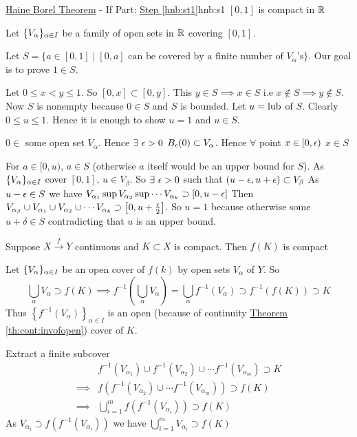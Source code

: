 \begin{Theorem}{\hyperref[th:hnb]{Haine Borel Theorem} - If Part: \hyperref[hnb:st1]{Step \ref{hnb:st1}}}{hnb:s1}
	$[0,1]$ is compact in $\mathbb{R}$
\end{Theorem}
\begin{myproof}
	Let $\{V_{\alpha}\}_{\alpha\in I}$ be a family of open sets in $\mathbb{R}$ covering $[0,1]$.

	Let $S=\{a\in [0,1]\mid [0,a]\text{ can be covered by a finite number of }V_{\alpha}\text{'s}\}$. Our goal is to prove $1\in S$.

	Let $0\leq x<y\leq 1$. So $[0,x]\subset [0,y]$. This $y\in S\implies x\in S$ i.e $x\notin S\implies y\notin S$. Now $S$ is nonempty because $0\in S$ and $S$ is bounded. Let $u=\text{lub}$ of $S$. Clearly $0\leq u\leq 1$. Hence it is enough to show $u=1$ and $u\in S$.

	$0\in$ some open set $V_{\alpha}$. Hence $\exists\ \epsilon>0$ $B_{\epsilon}(0)\subset V_{\alpha}$. Hence $\forall$ point $x\in [0,\epsilon)$ $x\in S$

	For $a\in[0,u)$, $a\in S$ (otherwise $a$ itself would be an upper bound for $S$). As $\{V_{\alpha}\}_{\alpha\in I}$ cover $[0,1]$, $u\in V_{\beta}$. So $\exists \ \epsilon>0$ such that $(u-\epsilon,u+\epsilon)\subset V_{\beta}$ As $u-\epsilon\in S$ we have $V_{\alpha_{1}}\sup V_{\alpha_{2}}\sup\cdots V_{\alpha_{k}}\supset [0,u-\epsilon]$ Then $V_{\alpha_{\beta}}\cup V_{\alpha_{1}}\cup V_{\alpha_{2}}\cup \cdots V_{\alpha_{k}}\supset \left[0,u+\frac{\epsilon}{2}\right]$. So $u=1$ because otherwise some $u+\delta\in S$ contradicting that $u$ is an upper bound.
\end{myproof}
\begin{Theorem}{}{}
	Suppose $X\xrightarrow{f} Y$ continuous and $K\subset X$ is compact. Then $f(K)$ is compact
\end{Theorem}
\begin{myproof}
	Let $\{V_{\alpha}\}_{\alpha\in I}$ be an open cover of $f(k)$ by open sets $V_{\alpha}$ of $Y$. So $$\bigcup\limits_{\alpha}V_{\alpha} \supset f(K)\implies f^{-1}\left(\bigcup\limits_{\alpha}V_{\alpha}\right)=\bigcup\limits_{\alpha}f^{-1}\left(V_{\alpha}\right)\supset f^{-1}(f(K))\supset K$$ Thus $\left\{f^{-1}(V_{\alpha})\right\}_{\alpha\in I}$ is an open (because of continuity \hyperref[th:cont:invofopen]{Theorem \ref{th:cont:invofopen}}) cover of $K$.

	Extract a finite subcover \begin{align*}
		         & f^{-1}\left(V_{\alpha_1}\right)\cup f^{-1}\left(V_{\alpha_2}\right) \cup \cdots f^{-1}\left(V_{\alpha_m}\right)\supset K \\
		\implies & f\left(f^{-1}\left(V_{\alpha_2}\right) \cup \cdots f^{-1}\left(V_{\alpha_m}\right)\right)\supset f(K)                    \\
		\implies & \bigcup_{i=1}^m f\left(f^{-1}\left(V_{\alpha_i}\right)\right)\supset f(K)
	\end{align*}
	As $V_{\alpha_i}\supset f\left(f^{-1}\left(V_{\alpha_i}\right)\right)$ we have $\bigcup\limits_{i=1}^mV_{\alpha_i}\supset f(K)$
\end{myproof}


